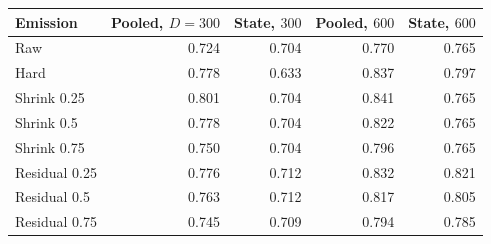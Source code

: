 \begin{tabular}{lrrrr}
\toprule
Emission & Pooled, $D=300$ & State, $300$ & Pooled, $600$ & State, $600$ \\
\midrule
Raw & 0.724 & 0.704 & 0.770 & 0.765 \\
Hard & 0.778 & 0.633 & 0.837 & 0.797 \\
Shrink 0.25 & 0.801 & 0.704 & 0.841 & 0.765 \\
Shrink 0.5 & 0.778 & 0.704 & 0.822 & 0.765 \\
Shrink 0.75 & 0.750 & 0.704 & 0.796 & 0.765 \\
Residual 0.25 & 0.776 & 0.712 & 0.832 & 0.821 \\
Residual 0.5 & 0.763 & 0.712 & 0.817 & 0.805 \\
Residual 0.75 & 0.745 & 0.709 & 0.794 & 0.785 \\
\bottomrule
\end{tabular}
